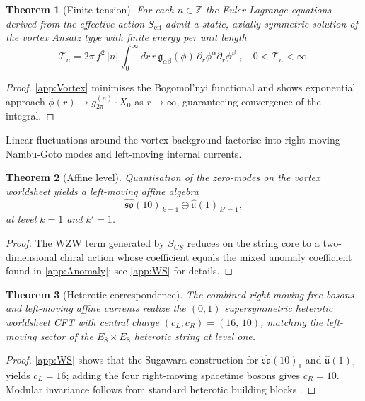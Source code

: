 \documentclass[pdflatex,sn-mathphys-num]{sn-jnl}
\theoremstyle{thmstyleone}
\newtheorem{theorem}{Theorem}
\theoremstyle{thmstyletwo}%
\theoremstyle{thmstylethree}%
\begin{document}
\begin{theorem}[Finite tension]
\label{thm:Tension}
For each \(n\in\mathbb Z\) the Euler-Lagrange equations
derived from the effective action
\(S_{\text{eff}}\) admit a static, axially symmetric
solution of the vortex Ansatz type with finite energy per unit length
\[
  \mathcal T_{n}
  = 2\pi\,f^{2}\,|n|\,
    \int_{0}^{\infty}dr\,
     r\,\mathfrak g_{\alpha\beta}(\phi)\,
     \partial_{r}\phi^{\alpha}\partial_{r}\phi^{\beta}\;,
  \quad
  0<\mathcal T_{n}<\infty.
\]
\end{theorem}

\begin{proof}
\autoref{app:Vortex} minimises the Bogomol’nyi functional and shows
exponential approach \(\phi(r)\to g_{2\pi}^{(n)}\cdot X_{0}\) as
\(r\to\infty\), guaranteeing convergence of the integral.
\end{proof}

Linear fluctuations around the vortex background factorise into
right-moving Nambu-Goto modes and left-moving internal currents.

\begin{theorem}[Affine level]\label{thm:Affine}
Quantisation of the zero-modes on the vortex worldsheet yields a
left-moving affine algebra
\[
  \widehat{\mathfrak{so}}(10)_{\,k=1}\oplus \widehat{\mathfrak u}(1)_{\,k'=1},
\]
at level \(k=1\) and \(k'=1\).
\end{theorem}

\begin{proof}
The WZW term generated by
\(S_{GS}\) reduces on the string core to a
two-dimensional chiral action whose coefficient equals the mixed
anomaly coefficient found in \autoref{app:Anomaly};
see \autoref{app:WS} for details.
\end{proof}

\begin{theorem}[Heterotic correspondence]\label{thm:HeteroticCFT}
The combined right-moving free bosons and left-moving affine currents
realize the \((0,1)\) supersymmetric
heterotic worldsheet CFT with central charge
\((c_{L},c_{R})=(16,\,10)\), matching the left-moving sector of the
\(E_{8}\times E_{8}\) heterotic string at level one.
\end{theorem}

\begin{proof}
\autoref{app:WS} shows that the Sugawara construction for
\(\widehat{\mathfrak{so}}(10)_{1}\) and
\(\widehat{\mathfrak u}(1)_{1}\) yields \(c_{L}=16\); adding the four
right-moving spacetime bosons gives \(c_{R}=10\).  Modular
invariance follows from standard heterotic building blocks
\cite{GodfreyOlive:1985}.
\end{proof}
\end{document}
